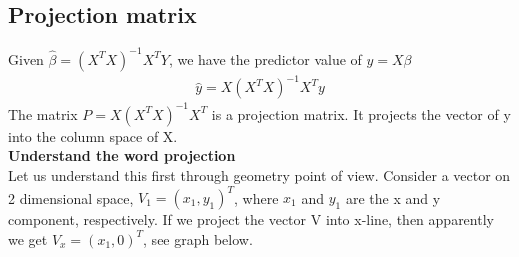 \documentclass[a4paper]{article}
\begin{document}
\subsection{Projection matrix}
Given $\hat \beta = (X^TX)^{-1}X^TY$, we have the predictor value of $y=X\beta$ 
\begin{align*}
\hat y = X(X^TX)^{-1}X^T y
\end{align*}
The matrix $P=X(X^TX)^{-1}X^T$ is a projection matrix. It projects the vector of y into the column space of X.\\
{\bf Understand the word projection}\\
Let us understand this first through geometry point of view. Consider a vector on 2 dimensional space, $V_1= (x_1, y_1)^T$, where $x_1$ and $y_1$ are the x and y component, respectively. If we project the vector V into x-line, then apparently we get $V_x= (x_1, 0)^T$, see graph below.
\end{document}
